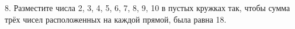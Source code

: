 8. Разместите числа 2, 3, 4, 5, 6, 7, 8, 9, 10 в пустых кружках так, чтобы сумма трёх чисел расположенных на каждой прямой, была равна 18.
\begin{center}
\begin{figure}[h!]
\end{figure}
\end{center}
